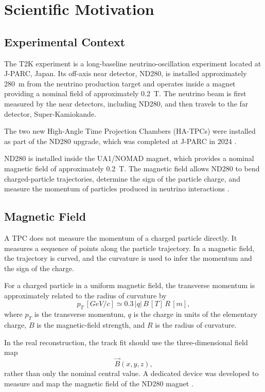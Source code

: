 \chapter{Scientific Motivation}

\section{Experimental Context}

The T2K experiment is a long-baseline neutrino-oscillation experiment located at J-PARC, Japan. Its off-axis near detector, ND280, is installed approximately \SI{280}{m} from the neutrino production target and operates inside a magnet providing a nominal field of approximately \SI{0.2}{T}. The neutrino beam is first measured by the near detectors, including ND280, and then travels to the far detector, Super-Kamiokande.

The two new High-Angle Time Projection Chambers (HA-TPCs) were installed as part of the ND280 upgrade, which was completed at J-PARC in 2024 \cite{HATPCPerformance}.

ND280 is installed inside the UA1/NOMAD magnet, which provides a nominal magnetic field of approximately \SI{0.2}{T}. The magnetic field allows ND280 to bend charged-particle trajectories, determine the sign of the particle charge, and measure the momentum of particles produced in neutrino interactions \cite{TPCWorkshop,NewTPCsGDR,ND280Review}.

\section{Magnetic Field}

A TPC does not measure the momentum of a charged particle directly. It measures a sequence of points along the particle trajectory. In a magnetic field, the trajectory is curved, and the curvature is used to infer the momentum and the sign of the charge.

For a charged particle in a uniform magnetic field, the transverse momentum is approximately related to the radius of curvature by
\begin{equation}
 p_T\,[\si{GeV/c}] \simeq 0.3\,|q|\,B\,[\si{T}]\,R\,[\si{m}],
 \label{eq:pt}
\end{equation}
where $p_T$ is the transverse momentum, $q$ is the charge in units of the elementary charge, $B$ is the magnetic-field strength, and $R$ is the radius of curvature.

In the real reconstruction, the track fit should use the three-dimensional field map
\begin{equation}
 \vec{B}(x,y,z),
 \label{eq:bmap}
\end{equation}
rather than only the nominal central value. A dedicated device was developed to measure and map the magnetic field of the ND280 magnet \cite{MagneticFieldDevice}.

